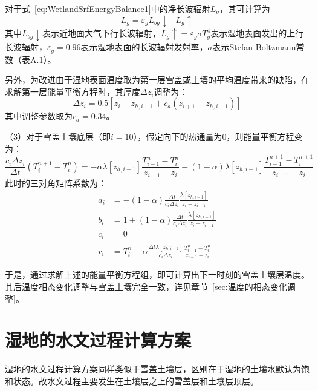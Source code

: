 对于式~\eqref{eq:WetlandSrfEnergyBalance1}中的净长波辐射$L_g$，其可计算为
\begin{equation}
    L_g = \varepsilon_g L_{bg}\downarrow - L_g\uparrow
\end{equation}
其中$L_{bg}\downarrow$表示近地面大气下行长波辐射，$L_g\uparrow=\varepsilon_g\sigma T^4_g$表示湿地表面发出的上行长波辐射，$\varepsilon_g=0.96$表示湿地表面的长波辐射发射率，$\sigma$表示Stefan-Boltzmann常数（表A.1）。

另外，为改进由于湿地表面温度取为第一层雪盖或土壤的平均温度带来的缺陷，在求解第一层能量平衡方程时，其厚度$\Delta z_i$调整为：
\begin{equation}
    \Delta z_i = 0.5\left[z_i-z_{h,i-1}+c_a\left(z_{i+1}-z_{h,i-1}\right)\right]
\end{equation}
其中调整参数取为$c_a=0.34$。

（3）对于雪盖土壤底层（即$i=10$），假定向下的热通量为0，则能量平衡方程变为：
\begin{equation}
    \frac{c_{i} \Delta z_{i}}{\Delta t}\left(T_{i}^{n+1}-T_{i}^{n}\right)=-\alpha \lambda\left[z_{h, i-1}\right] \frac{T_{i-1}^{n}-T_{i}^{n}}{z_{i-1}-z_{i}}-(1-\alpha) \lambda\left[z_{h, i-1}\right] \frac{T_{i-1}^{n+1}-T_{i}^{n+1}}{z_{i-1}-z_{i}}
\end{equation}
此时的三对角矩阵系数为：
\begin{equation}
\begin{aligned}
a_{i} &= -(1-\alpha) \frac{\Delta t}{c_{i} \Delta z_{i}} \frac{\lambda\left[z_{h, i-1}\right]}{z_{i}-z_{i-1}} \\
b_{i} &= 1+(1-\alpha) \frac{\Delta t}{c_{i} \Delta z_{i}} \frac{\lambda\left[z_{h, i-1}\right]}{z_{i}-z_{i-1}} \\
c_{i} &= 0 \\
r_{i} &= T_{i}^{n}-\alpha \frac{\Delta t \lambda\left[z_{h, i-1}\right]}{c_{i} \Delta z_{i}} \frac{T_{i-1}^{n}-T_{i}^{n}}{z_{i-1}-z_{i}}
\end{aligned}
\end{equation}

于是，通过求解上述的能量平衡方程组，即可计算出下一时刻的雪盖土壤层温度。其后温度相态变化调整与雪盖土壤完全一致，详见章节~\ref{sec:温度的相态变化调整}。


\section{湿地的水文过程计算方案}
湿地的水文过程计算方案同样类似于雪盖土壤层，区别在于湿地的土壤水默认为饱和状态。故水文过程主要发生在土壤层之上的雪盖层和土壤层顶层。

